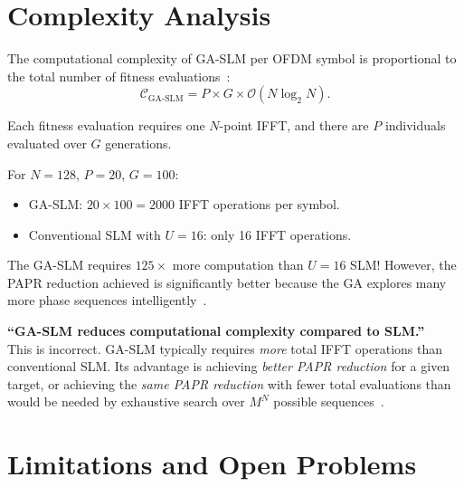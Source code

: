 \section{Complexity Analysis}
\label{sec:gaslm_complexity}

The computational complexity of GA-SLM per OFDM symbol is
proportional to the total number of fitness evaluations~\cite{ali2016new}:
\begin{equation}
    \mathcal{C}_{\mathrm{GA\text{-}SLM}}
    = P \times G \times \mathcal{O}(N \log_2 N).
    \label{eq:gaslm_complexity}
\end{equation}

Each fitness evaluation requires one $N$-point IFFT, and there are $P$
individuals evaluated over $G$ generations.

\begin{workingexample}
    For $N=128$, $P=20$, $G=100$:
    \begin{itemize}
        \item GA-SLM: $20 \times 100 = 2000$ IFFT operations per symbol.
        \item Conventional SLM with $U=16$: only 16 IFFT operations.
    \end{itemize}
    The GA-SLM requires $125\times$ more computation than $U=16$ SLM!
    However, the PAPR reduction achieved is significantly better
    because the GA explores many more phase sequences
    intelligently~\cite{ali2016new}.
\end{workingexample}

\begin{misconception}
    \textbf{``GA-SLM reduces computational complexity compared to SLM.''} \\
    This is incorrect.  GA-SLM typically requires \emph{more} total IFFT
    operations than conventional SLM.  Its advantage is achieving
    \emph{better PAPR reduction} for a given target, or achieving the
    \emph{same PAPR reduction} with fewer total evaluations than
    would be needed by exhaustive search over $M^N$ possible
    sequences~\cite{ali2016new}.
\end{misconception}


\section{Limitations and Open Problems}
\label{sec:gaslm_limitations}

